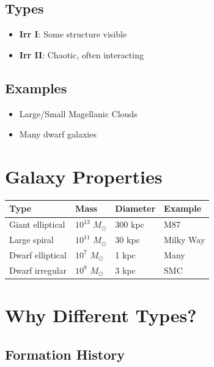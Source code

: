 \documentclass[
  11pt,
  letterpaper,
  twoside,
  openright]{book}
\providecommand{\tightlist}{%
  \setlength{\itemsep}{0pt}\setlength{\parskip}{0pt}}
\begin{document}
\subsection{Types}\label{types-2}

\begin{itemize}
\tightlist
\item
  \textbf{Irr I}: Some structure visible
\item
  \textbf{Irr II}: Chaotic, often interacting
\end{itemize}

\subsection{Examples}\label{examples-2}

\begin{itemize}
\tightlist
\item
  Large/Small Magellanic Clouds
\item
  Many dwarf galaxies
\end{itemize}

\section{Galaxy Properties}\label{galaxy-properties}

\begin{longtable}[]{@{}llll@{}}
\toprule\noalign{}
Type & Mass & Diameter & Example \\
\midrule\noalign{}
\endhead
\bottomrule\noalign{}
\endlastfoot
Giant elliptical & \(10^{13}\) \(M_\odot\) & 300 kpc & M87 \\
Large spiral & \(10^{11}\) \(M_\odot\) & 30 kpc & Milky Way \\
Dwarf elliptical & \(10^7\) \(M_\odot\) & 1 kpc & Many \\
Dwarf irregular & \(10^8\) \(M_\odot\) & 3 kpc & SMC \\
\end{longtable}

\section{Why Different Types?}\label{why-different-types}

\subsection{Formation History}\label{formation-history}
\end{document}
